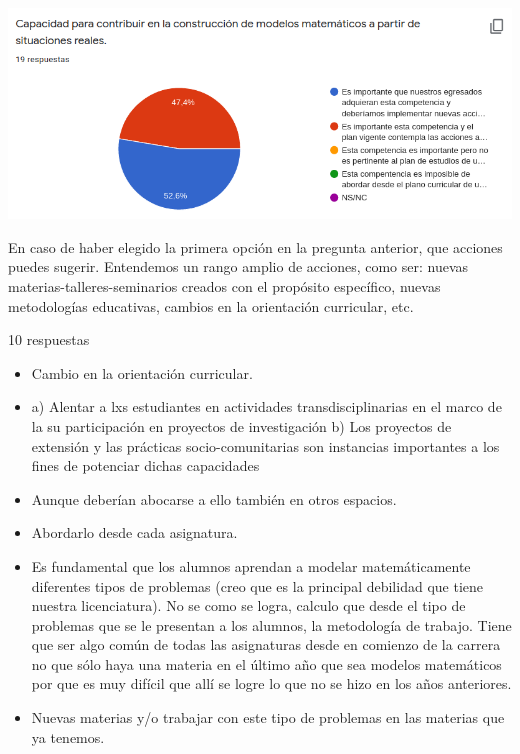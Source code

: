\documentclass[a4paper,10pt,BCOR10mm,oneside,headsepline]{scrbook}
\begin{document}
\begin{subappendices}
\begin{center}
\includegraphics[scale=.9]{doc14.png}
 \end{center}
 
 En caso de haber elegido la primera opción en la pregunta anterior, que acciones puedes sugerir. Entendemos un rango amplio de acciones, como ser: nuevas materias-talleres-seminarios creados con el propósito específico, nuevas metodologías educativas, cambios en la orientación curricular, etc. 
 
 10 respuestas
 
 \begin{itemize}
 
 
\item Cambio en la orientación curricular. 
\item a) Alentar a lxs estudiantes en actividades transdisciplinarias en el marco de la su  participación en proyectos de investigación b) Los proyectos de extensión y las prácticas socio-comunitarias son instancias importantes a los fines de potenciar dichas capacidades

\item Aunque deberían abocarse a ello también  en otros espacios.

\item Abordarlo desde cada asignatura.

\item Es fundamental que los alumnos aprendan a modelar matemáticamente diferentes tipos de problemas (creo que es la principal debilidad que tiene nuestra licenciatura). No se como se logra, calculo que desde el tipo de problemas que se le presentan a los alumnos, la metodología de trabajo. Tiene que ser algo común de todas las asignaturas desde en comienzo de la carrera no que sólo haya una materia en el último año que sea modelos matemáticos por que es muy difícil que allí se  logre lo que no se hizo en los años anteriores.

\item Nuevas materias y/o trabajar con este tipo de problemas en las materias que ya tenemos.


\end{itemize}
\end{subappendices}
\end{document}
